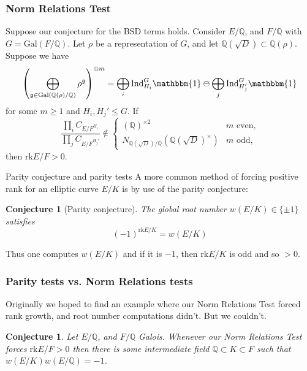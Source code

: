 \documentclass{beamer}
\newcommand{\Gal}{\mathrm{Gal}}
\newcommand{\rk}{\mathrm{rk}}
\newcommand{\Ind}{\mathrm{Ind}}
\newcommand{\QQ}{\mathbb{Q}}
\newcommand{\bQ}{\mathbb{Q}}
\theoremstyle{plain}
\newtheorem{conjecture}[thm]{Conjecture}
\begin{document}
\begin{frame}
    \frametitle{Norm Relations Test}
    \begin{theorem}\label{thm_positive_rank}
    \small{  Suppose our conjecture for the BSD terms holds. Consider $E/\QQ$, and $F/\QQ$  with $G = \Gal(F / \bQ)$. Let $\rho$ be a representation of $G$, and let $\bQ(\sqrt{D}) \subset \bQ(\rho)$. Suppose we have  
        $$\left(\bigoplus_{\mathfrak{g}\in\Gal(\QQ(\rho)/\QQ)}\rho^{\mathfrak{g}}\right)^{\oplus m}=\bigoplus_i\Ind_{H_i}^G\mathbbm{1}\ominus\bigoplus_j\Ind_{H'_j}^G\mathbbm{1}$$
        for some $m\geq 1$ and $H_i, H_j' \leq G$. If 
        $$\frac{\prod_i C_{E/F^{H_i}}}{\prod_j C_{E/F^{H_j'}}} \not\in
        \begin{cases}
            (\bQ)^{\times 2} & m \text{ even,}\\
            N_{\bQ(\sqrt{D}) / \bQ}(\bQ(\sqrt{D})^{\times}) & m \text{ odd,}
        \end{cases}
        $$
        then $\rk E / F > 0.$ }
    \end{theorem}
\end{frame}

\begin{frame}{Parity conjecture and parity tests}
    A more common method of forcing positive rank for an elliptic curve $E / K$ is by use of the parity conjecture:
    \begin{conjecture}[Parity conjecture]\label{parity}
            The \textit{global root number} $w(E / K) \in \{ \pm 1 \}$ satisfies 
            $$(-1)^{\rk E / K} = w(E / K)$$
    \end{conjecture} \pause
    
    Thus one computes $w(E / K)$ and if it is $-1$, then $\rk E / K$ is odd and so $> 0$. 

\end{frame}

\begin{frame}
    \frametitle{Parity tests vs. Norm Relations tests}

    Originally we hoped to find an example where our Norm Relations Test forced rank growth, and root number computations didn't. \pause But we couldn't. \pause \text{:(} \pause

    \begin{conjecture}
        Let $E / \bQ$, and $F / \bQ$ Galois. Whenever our Norm Relations Test forces $\rk E / F >0$ then there is some intermediate field $\bQ \subset K \subset F$ such that $w(E / K)w(E / \bQ) = -1$.
    \end{conjecture}
\end{frame}
\end{document}
